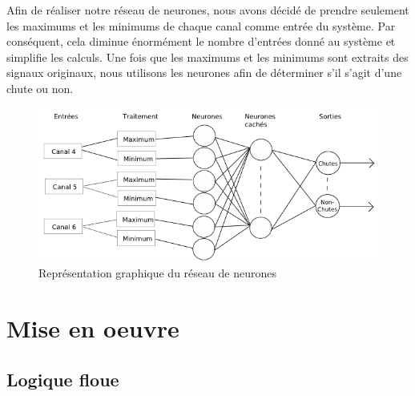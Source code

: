 \documentclass[12pt,letterpaper]{article}
\begin{document}
Afin de réaliser notre réseau de neurones, nous avons décidé de prendre seulement les maximums et les minimums de chaque canal comme entrée du système. Par conséquent, cela diminue énormément le nombre d'entrées donné au système et simplifie les calculs. Une fois que les maximums et les minimums sont extraits des signaux originaux, nous utilisons les neurones afin de déterminer s'il s'agit d'une chute ou non.

\begin{figure}
\centering
\includegraphics[scale=0.75]{images/NN.png}
\caption{Représentation graphique du réseau de neurones}
\label{fig:NN}
\end{figure}

\section{Mise en oeuvre}

\subsection{Logique floue}
\end{document}
